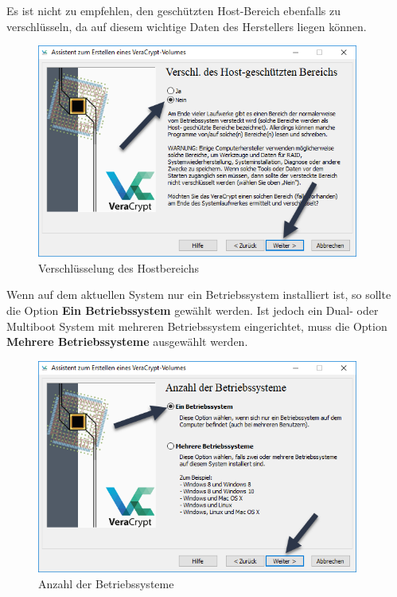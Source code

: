 \documentclass[12pt,a4paper]{scrreprt}
\begin{document}
\newpage

\noindent Es ist nicht zu empfehlen, den geschützten Host-Bereich ebenfalls zu verschlüsseln, da auf diesem wichtige Daten des Herstellers liegen können.

\begin{figure}[h]
\begin{center}
\includegraphics[width=300pt]{media/hostpart.png}
\caption{Verschlüsselung des Hostbereichs}
\label{hostpart}
\end{center}
\end{figure}

\newpage

\noindent Wenn auf dem aktuellen System nur ein Betriebssystem installiert ist, so sollte die Option \textbf{Ein Betriebssystem} gewählt werden. Ist jedoch ein Dual- oder Multiboot System mit mehreren Betriebssystem eingerichtet, muss die Option \textbf{Mehrere Betriebssysteme} ausgewählt werden.

\begin{figure}[h]
\begin{center}
\includegraphics[width=300pt]{media/oscount.png}
\caption{Anzahl der Betriebssysteme}
\label{oscount}
\end{center}
\end{figure}
\end{document}
